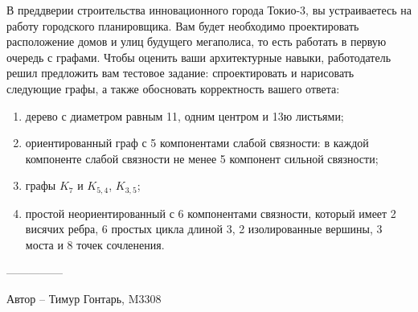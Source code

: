 \question
В преддверии строительства инновационного города Токио-3, вы устраиваетесь на работу городского планировщика. Вам будет необходимо проектировать расположение домов и улиц будущего мегаполиса, то есть работать в первую очередь с графами. Чтобы оценить ваши архитектурные навыки, работодатель решил предложить вам тестовое задание: спроектировать и нарисовать следующие графы, а также обосновать корректность вашего ответа:

\begin{enumerate}
\item  дерево с диаметром равным 11, одним центром  и  13ю листьями;
\item  ориентированный граф с 5 компонентами слабой связности: в  каждой компоненте слабой связности не менее 5 компонент сильной связности;
\item  графы $K_7$ и $K_{5,4}$, $K_{3,5}$;
\item  простой неориентированный с 6 компонентами связности, который имеет 2 висячих ребра, 6 простых цикла длиной 3, 2 изолированные вершины, 3 моста и 8 точек сочленения.
\end{enumerate}

---------------

Автор -- Тимур Гонтарь, M3308

